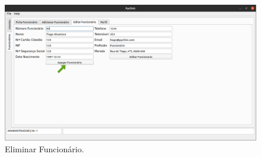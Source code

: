 \documentclass[11pt,a4paper,twoside]{article}
\begin{document}
\begin{figure}[H]
	\centering
	\includegraphics[width=0.9\linewidth]{image/admin/apagarFuncionario.png}
	\caption{Eliminar Funcionário.}
	\label{fig:eliminarfuncionario}
\end{figure}
\end{document}
